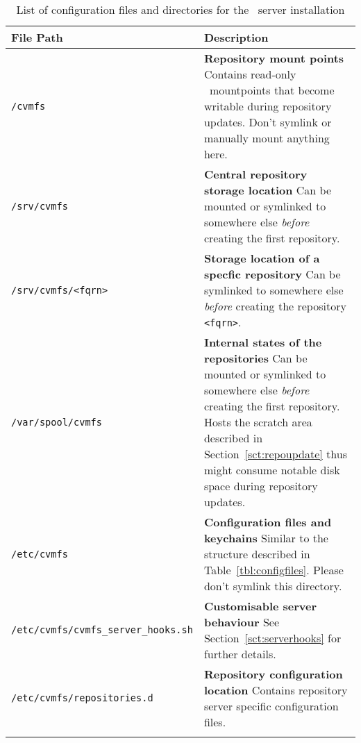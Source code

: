 \begin{longtable}{lX}
	\toprule
	{\bf\centering File Path} & {\bf\centering Description} \\
	\midrule

	\texttt{/cvmfs} & \textbf{Repository mount points} \newline
	Contains read-only \aufs\ mountpoints that become writable during repository updates. Don't symlink or manually mount anything here. \\
	\addlinespace

	\texttt{/srv/cvmfs} & \textbf{Central repository storage location} \newline
	Can be mounted or symlinked to somewhere else \emph{before} creating the first repository. \\
	\addlinespace

	\texttt{/srv/cvmfs/<fqrn>} & \textbf{Storage location of a specfic repository} \newline
	Can be symlinked to somewhere else \emph{before} creating the repository \texttt{<fqrn>}. \\
	\addlinespace

	\texttt{/var/spool/cvmfs} & \textbf{Internal states of the repositories} \newline
	Can be mounted or symlinked to somewhere else \emph{before} creating the first repository. Hosts the scratch area described in Section~\ref{sct:repoupdate} thus might consume notable disk space during repository updates. \\
	\addlinespace

	\texttt{/etc/cvmfs} & \textbf{Configuration files and keychains} \newline
	Similar to the structure described in Table~\ref{tbl:configfiles}. Please don't symlink this directory. \\
	\addlinespace

	\texttt{/etc/cvmfs/cvmfs\_server\_hooks.sh} & \textbf{Customisable server behaviour} \newline
	See Section~\ref{sct:serverhooks} for further details. \\
	\addlinespace

	\texttt{/etc/cvmfs/repositories.d} & \textbf{Repository configuration location} \newline
	Contains repository server specific configuration files.
	 \\
	\bottomrule
	\caption{List of configuration files and directories for the \cvmfs\ server installation}
	\label{tbl:serveranatomyelements}
\end{longtable}
